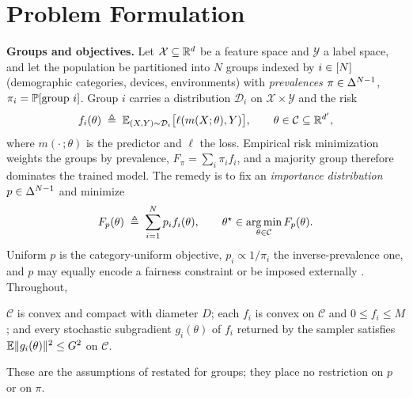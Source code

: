 \section{Problem Formulation}
\label{sec:setup}

\noindent\textbf{Groups and objectives.}
Let $\mathcal{X}\subseteq\mathbb{R}^d$ be a feature space and $\mathcal{Y}$ a label
space, and let the population be partitioned into $N$ groups indexed by
$i\in[N]$ (demographic categories, devices, environments) with
\emph{prevalences} $\pi\in\Delta^{N-1}$, $\pi_i=\mathbb{P}[\text{group }i]$. Group $i$
carries a distribution $\mathcal{D}_i$ on $\mathcal{X}\times\mathcal{Y}$ and
the risk
\[
f_i(\theta)\;\triangleq\;\mathbb{E}_{(X,Y)\sim\mathcal{D}_i}\big[\ell(m(X;\theta),Y)\big],
\qquad \theta\in\mathcal{C}\subseteq\mathbb{R}^{d'},
\]
where $m(\cdot\,;\theta)$ is the predictor and $\ell$ the loss. Empirical risk
minimization weights the groups by prevalence, $F_\pi=\sum_i\pi_i f_i$, and a
majority group therefore dominates the trained model. The remedy is to fix an
\emph{importance distribution} $p\in\Delta^{N-1}$ and minimize
\begin{equation}
F_p(\theta)\;\triangleq\;\sum_{i=1}^{N}p_i f_i(\theta),
\qquad
\theta^\star\in\operatorname*{arg\,min}_{\theta\in\mathcal{C}}F_p(\theta).
\label{eq:target}
\end{equation}
Uniform $p$ is the category-uniform objective, $p_i\propto 1/\pi_i$ the
inverse-prevalence one, and $p$ may equally encode a fairness constraint or
be imposed externally \cite{mohri2019agnostic,li2020fair}. Throughout,
\begin{assumption}
\label{ass:std}
$\mathcal{C}$ is convex and compact with diameter $D$; each $f_i$ is convex on
$\mathcal{C}$ and $0\le f_i\le M$; and every stochastic subgradient
$g_i(\theta)$ of $f_i$ returned by the sampler satisfies
$\mathbb{E}\|g_i(\theta)\|^2\le G^2$ on $\mathcal{C}$.
\end{assumption}
\noindent These are the assumptions of \cite{rahimi2025agnostic,rahimi2025fedavot}
restated for groups; they place no restriction on $p$ or on $\pi$.

